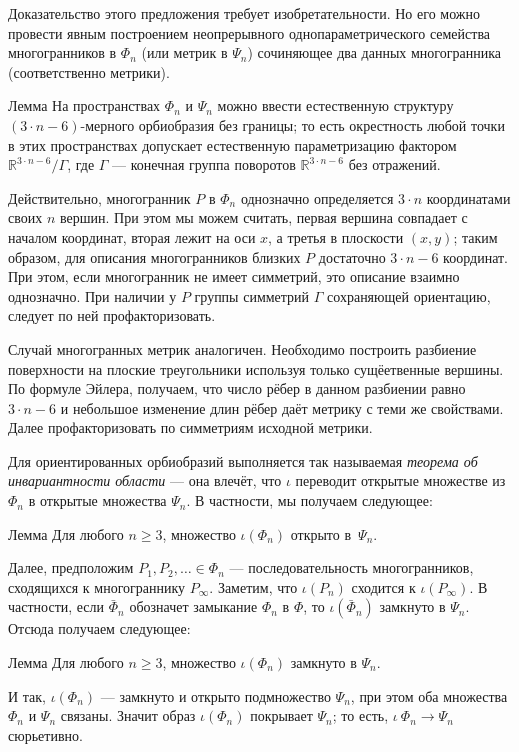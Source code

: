 \documentclass[oneside,a4paper]{article}
\begin{document}
Доказательство этого предложения требует изобретательности.
Но его можно провести явным построением неопрерывного однопараметрического семейства многогранников в $\Phi_n$ (или метрик в $\Psi_n$) сочиняющее два данных многогранника (соответственно метрики). 

\begin{thm}{Лемма}
На пространствах $\Phi_n$ и $\Psi_n$ можно ввести естественную структуру $(3\cdot n-6)$-мерного орбиобразия без границы; то есть окрестность любой точки в этих пространствах допускает естественную параметризацию фактором $\mathbb{R}^{3\cdot n-6}/\Gamma$, где $\Gamma$ --- конечная группа поворотов $\mathbb{R}^{3\cdot n-6}$ без отражений.
\end{thm}

Действительно, многогранник $P$ в $\Phi_n$ однозначно определяется $3\cdot n$ координатами своих $n$ вершин.
При этом мы можем считать, первая вершина совпадает с началом координат, вторая лежит на оси $x$, а третья в плоскости $(x,y)$; таким образом, для описания многогранников близких $P$ достаточно $3\cdot n-6$ координат.
При этом, если многогранник не имеет симметрий, это описание взаимно однозначно.
При наличии у $P$ группы симметрий $\Gamma$ сохраняющей ориентацию, следует по ней профакторизовать. 

Случай многогранных метрик аналогичен.
Необходимо построить разбиение поверхности на плоские треугольники используя только сущёетвенные вершины.
По формуле Эйлера, получаем, что число рёбер в данном разбиении равно $3\cdot n-6$ и небольшое изменение длин рёбер даёт метрику с теми же свойствами.
Далее профакторизовать по симметриям исходной метрики.

Для ориентированных орбиобразий выполняется так называемая \emph{теорема об инвариантности области} --- она влечёт, что $\iota$ переводит открытые множестве из $\Phi_n$ в открытые множества $\Psi_n$.
В частности, мы получаем следующее:


\begin{thm}{Лемма}
Для любого $n\ge 3$, множество $\iota(\Phi_n)$ открыто в~$\Psi_n$.
\end{thm}

Далее, предположим $P_1,P_2,\dots\in \Phi_n$ --- последовательность многогранников, сходящихся к многограннику $P_\infty$.
Заметим, что $\iota(P_n)$ сходится к $\iota(P_\infty)$.
В частности, если $\bar \Phi_n$ обозначет замыкание $\Phi_n$ в $\Phi$,
то $\iota(\bar\Phi_n)$ замкнуто в $\Psi_n$.
Отсюда получаем следующее:

\begin{thm}{Лемма}
Для любого $n\ge 3$, множество $\iota(\Phi_n)$ замкнуто в $\Psi_n$.
\end{thm}


И так, $\iota(\Phi_n)$ --- замкнуто и открыто подмножество $\Psi_n$, при этом оба множества $\Phi_n$ и $\Psi_n$ связаны.
Значит образ $\iota(\Phi_n)$ покрывает $\Psi_n$; то есть, $\iota\:\Phi_n\to\Psi_n$ сюрьетивно.
\qeds

  

\sloppy
\printbibliography[heading=bibintoc]
\fussy
\end{document}
